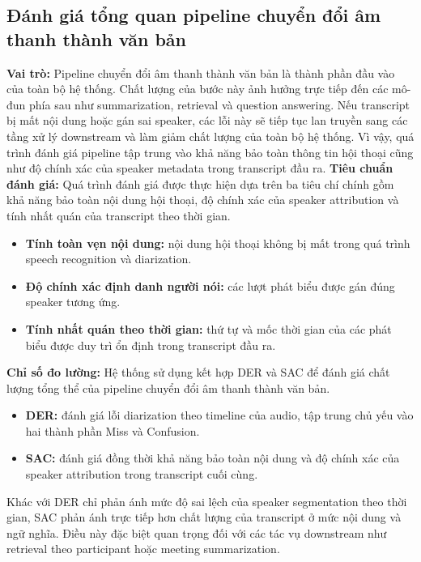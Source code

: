 \subsection{Đánh giá tổng quan pipeline chuyển đổi âm thanh thành văn bản}

\textbf{Vai trò:} Pipeline chuyển đổi âm thanh thành văn bản là thành phần đầu vào của toàn bộ hệ thống. Chất lượng của bước này ảnh hưởng trực tiếp đến các mô-đun phía sau như summarization, retrieval và question answering. Nếu transcript bị mất nội dung hoặc gán sai speaker, các lỗi này sẽ tiếp tục lan truyền sang các tầng xử lý downstream và làm giảm chất lượng của toàn bộ hệ thống. Vì vậy, quá trình đánh giá pipeline tập trung vào khả năng bảo toàn thông tin hội thoại cũng như độ chính xác của speaker metadata trong transcript đầu ra.
\textbf{Tiêu chuẩn đánh giá:} Quá trình đánh giá được thực hiện dựa trên ba tiêu chí chính gồm khả năng bảo toàn nội dung hội thoại, độ chính xác của speaker attribution và tính nhất quán của transcript theo thời gian.
\begin{itemize}
    \item \textbf{Tính toàn vẹn nội dung:} nội dung hội thoại không bị mất trong quá trình speech recognition và diarization.
    \item \textbf{Độ chính xác định danh người nói:} các lượt phát biểu được gán đúng speaker tương ứng.
    \item \textbf{Tính nhất quán theo thời gian:} thứ tự và mốc thời gian của các phát biểu được duy trì ổn định trong transcript đầu ra.
\end{itemize}

\textbf{Chỉ số đo lường:} Hệ thống sử dụng kết hợp DER và SAC để đánh giá chất lượng tổng thể của pipeline chuyển đổi âm thanh thành văn bản.
\begin{itemize}
    \item \textbf{DER:} đánh giá lỗi diarization theo timeline của audio, tập trung chủ yếu vào hai thành phần Miss và Confusion.
    \item \textbf{SAC:} đánh giá đồng thời khả năng bảo toàn nội dung và độ chính xác của speaker attribution trong transcript cuối cùng.
\end{itemize}

Khác với DER chỉ phản ánh mức độ sai lệch của speaker segmentation theo thời gian, SAC phản ánh trực tiếp hơn chất lượng của transcript ở mức nội dung và ngữ nghĩa. Điều này đặc biệt quan trọng đối với các tác vụ downstream như retrieval theo participant hoặc meeting summarization.

